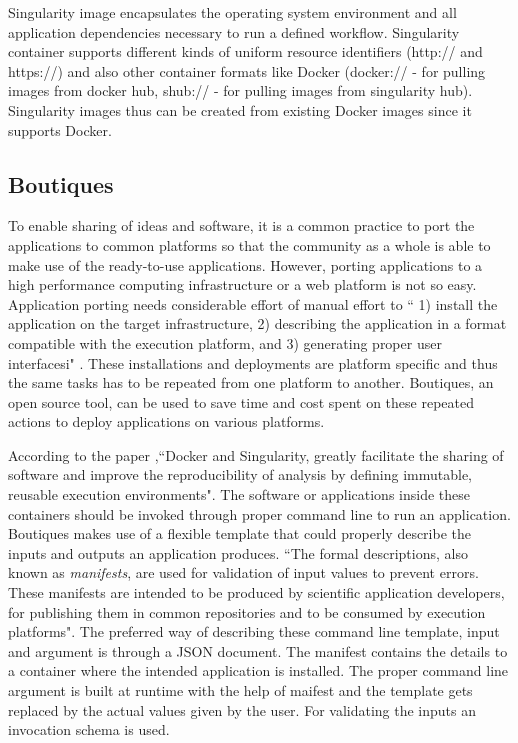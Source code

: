 Singularity image encapsulates the operating system environment and all application dependencies necessary to run a defined workflow. Singularity container supports different kinds of uniform resource identifiers (http:// and https://) and also other container formats like Docker (docker:// - for pulling images from docker hub, shub:// - for pulling images from singularity hub). Singularity images thus can be created from existing Docker images since it supports Docker.

\subsection{Boutiques}
To enable sharing of ideas and software, it is a common practice to port the applications to common platforms so that the community as a whole is able to make use of the ready-to-use applications. However, porting applications to a high performance computing infrastructure or a web platform is not so easy. Application porting needs considerable effort of manual effort to `` 1) install the application on the target infrastructure, 2) describing the application in a format compatible with the execution platform, and 3) generating proper user interfacesi" \cite{boutiques}. These installations and deployments are platform specific and thus the same tasks has to be repeated from one platform to another. Boutiques, an open source tool, can be used to save time and cost spent on these repeated actions to deploy applications on various platforms. 

According to the paper \cite{boutiques} ,``Docker and Singularity, greatly facilitate the sharing of software and improve the reproducibility of analysis by defining immutable, reusable execution environments". The software or applications inside these containers should be invoked through proper command line to run an application. Boutiques makes use of a flexible template that could properly describe the inputs and outputs an application produces. ``The formal descriptions, also known as \textit{manifests}, are used for validation of input values to prevent errors. These manifests are intended to be produced by scientific application developers, for publishing them in common repositories and to be consumed by execution platforms". The preferred way of describing these command line template, input and argument is through a JSON document. The manifest contains the details to a container where the intended application is installed. The proper command line argument is built at runtime with the help of maifest and the template gets replaced by the actual values given by the user. For validating the inputs an invocation schema is used. 

